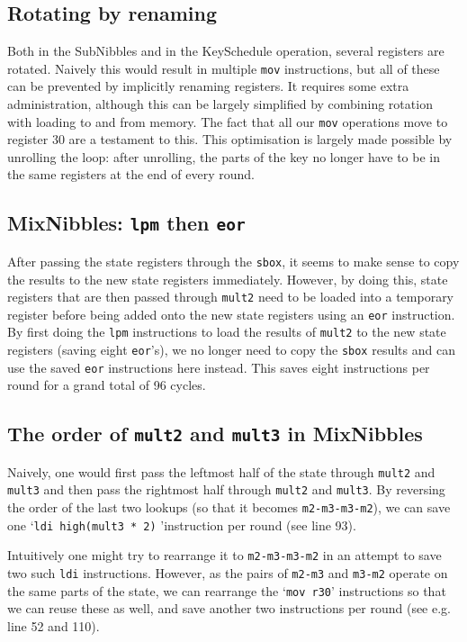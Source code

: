 \documentclass[a4paper]{article}
\begin{document}
\subsection*{Rotating by renaming}

Both in the SubNibbles and in the KeySchedule operation, several registers are rotated. Naively this would result in multiple \texttt{mov} instructions, but all of these can be prevented by implicitly renaming registers. It requires some extra administration, although this can be largely simplified by combining rotation with loading to and from memory. The fact that all our \texttt{mov} operations move to register 30 are a testament to this. This optimisation is largely made possible by unrolling the loop: after unrolling, the parts of the key no longer have to be in the same registers at the end of every round.

\hypertarget{lpmtheneor}{}
\subsection*{MixNibbles: \texttt{lpm} then \texttt{eor}}

After passing the state registers through the \texttt{sbox}, it seems to make sense to copy the results to the new state registers immediately. However, by doing this, state registers that are then passed through \texttt{mult2} need to be loaded into a temporary register before being added onto the new state registers using an \texttt{eor} instruction. By first doing the \texttt{lpm} instructions to load the results of \texttt{mult2} to the new state registers (saving eight \texttt{eor}'s), we no longer need to copy the \texttt{sbox} results and can use the saved \texttt{eor} instructions here instead. This saves eight instructions per round for a grand total of 96 cycles.

\subsection*{The order of \texttt{mult2} and \texttt{mult3} in MixNibbles}

Naively, one would first pass the leftmost half of the state through \texttt{mult2} and \texttt{mult3} and then pass the rightmost half through \texttt{mult2} and \texttt{mult3}. By reversing the order of the last two lookups (so that it becomes \texttt{m2-m3-m3-m2}), we can save one `\texttt{ldi high(mult3 * 2)} 'instruction per round (see line 93).

Intuitively one might try to rearrange it to \texttt{m2-m3-m3-m2} in an attempt to save two such \texttt{ldi} instructions. However, as the pairs of \texttt{m2-m3} and \texttt{m3-m2} operate on the same parts of the state, we can rearrange the `\texttt{mov r30}' instructions so that we can reuse these as well, and save another two instructions per round (see e.g. line 52 and 110).
\end{document}
